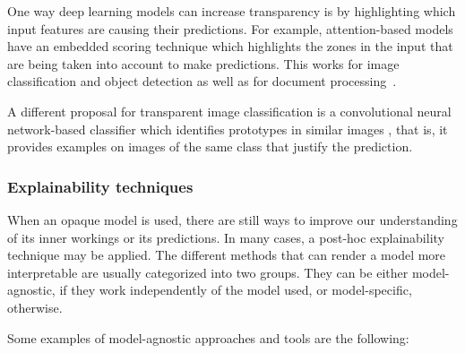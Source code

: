 One way deep learning models can increase transparency is by highlighting which input features are causing their predictions. For example, attention-based models  have an embedded scoring technique which highlights the zones in the input that are being taken into account to make predictions. This works for image classification and object detection  as well as for document processing~. 

A different proposal for transparent image classification is a convolutional neural network-based classifier which identifies prototypes in similar images , that is, it provides examples on images of the same class that justify the prediction.

\subsubsection{Explainability techniques}

When an opaque model is used, there are still ways to improve our understanding of its inner workings or its predictions. In many cases, a post-hoc explainability technique may be applied. %
The different methods that can render a model more interpretable are usually categorized into two groups. They can be either model-agnostic, if they work independently of the model used, or model-specific, otherwise. 

Some examples of model-agnostic approaches and tools are the following:

